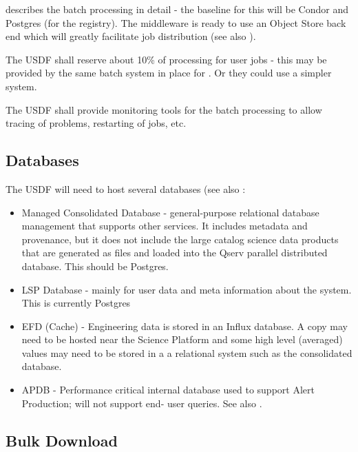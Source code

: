  describes the batch processing in detail - the baseline
for this will be Condor and Postgres (for the registry). The middleware is
ready to use an Object Store back end which will greatly facilitate job
distribution (see also ).

\reqsimp{}{}{}{}{}
{
The USDF shall reserve about 10\% of processing for user jobs - this may be provided by the same batch system in place for . Or they could use a simpler system.
}

\reqsimp{}{}{}{}{}
{
The USDF shall provide monitoring tools for the batch processing to allow tracing of problems, restarting of jobs, etc.
}



\subsection{Databases} \label{sec:dbs}

The USDF will need to host several databases (see also :

\begin{itemize}
\item Managed Consolidated Database - general-purpose relational database management
that supports other services. It includes metadata and provenance, but
it does not include the large catalog science data products that are
generated as files and loaded into the Qserv parallel distributed
database. This should be Postgres.

\item LSP Database - mainly for user data and meta information about the system. This is currently Postgres
\item \gls{EFD} (Cache) - Engineering data is stored in an Influx database. A copy may need to be hosted near the Science Platform and some high level (averaged) values may need to be stored in a a relational system such
as the consolidated database.
\item \gls{APDB} - Performance critical internal database used to support Alert Production; will not support end- user queries.  See also .
\end{itemize}




\subsection {Bulk Download}
\label{sec:bulk}

